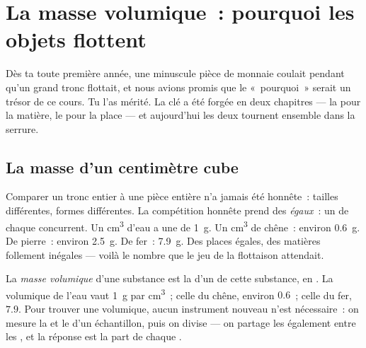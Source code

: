 \chapter{La masse volumique~: pourquoi les objets flottent}\label{ch:g6:density-floating}

Dès ta toute première année, une minuscule pièce de monnaie coulait
pendant qu'un grand tronc flottait, et nous avions promis que le
«~pourquoi~» serait un trésor de ce cours. Tu l'as mérité. La clé a
été forgée en deux chapitres --- la  pour la matière, le 
pour la place --- et aujourd'hui les deux tournent ensemble dans la
serrure.

\section{La masse d'un centimètre cube}

\begin{example}\label{ex:g6:density-floating:fair}
Comparer un tronc entier à une pièce entière n'a jamais été
honnête~: tailles différentes, formes différentes. La compétition
honnête prend des \emph{ égaux}~: un  de chaque
concurrent. Un \unit{cm^3} d'eau a une  de \qty{1}{g}. Un
\unit{cm^3} de chêne~: environ \qty{0.6}{g}. De pierre~: environ
\qty{2.5}{g}. De fer~: \qty{7.9}{g}. Des places égales, des matières
follement inégales --- voilà le nombre que le jeu de la flottaison
attendait.
\end{example}

\begin{definition}\label{def:g6:density-floating:density}
La \emph{masse volumique} d'une substance est
la  d'un  de cette substance, en . La
 volumique de l'eau vaut \qty{1}{g} par \unit{cm^3}~; celle du
chêne, environ $0.6$~; celle du fer, $7.9$. Pour trouver une 
volumique, aucun instrument nouveau n'est nécessaire~: on mesure la
 et le  d'un échantillon, puis on divise --- on partage
les  également entre les , et la réponse est
la part de chaque .
\end{definition}

